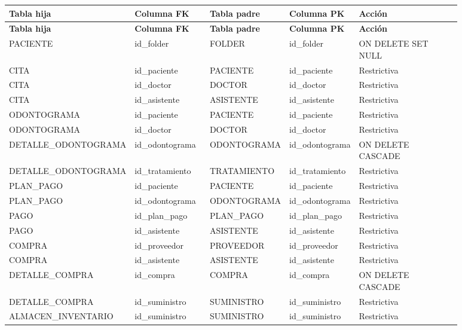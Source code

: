 \begin{longtable}{p{0.18\linewidth}p{0.18\linewidth}p{0.08\linewidth}p{0.08\linewidth}p{0.36\linewidth}}
\toprule
\textbf{Tabla hija} & \textbf{Columna FK} & \textbf{Tabla padre} & \textbf{Columna PK} & \textbf{Acción} \\
\midrule
\endfirsthead
\toprule
\textbf{Tabla hija} & \textbf{Columna FK} & \textbf{Tabla padre} & \textbf{Columna PK} & \textbf{Acción} \\
\midrule
\endhead
PACIENTE & id\_folder & FOLDER & id\_folder & ON DELETE SET NULL \\
CITA & id\_paciente & PACIENTE & id\_paciente & Restrictiva \\
CITA & id\_doctor & DOCTOR & id\_doctor & Restrictiva \\
CITA & id\_asistente & ASISTENTE & id\_asistente & Restrictiva \\
ODONTOGRAMA & id\_paciente & PACIENTE & id\_paciente & Restrictiva \\
ODONTOGRAMA & id\_doctor & DOCTOR & id\_doctor & Restrictiva \\
DETALLE\_ODONTOGRAMA & id\_odontograma & ODONTOGRAMA & id\_odontograma & ON DELETE CASCADE \\
DETALLE\_ODONTOGRAMA & id\_tratamiento & TRATAMIENTO & id\_tratamiento & Restrictiva \\
PLAN\_PAGO & id\_paciente & PACIENTE & id\_paciente & Restrictiva \\
PLAN\_PAGO & id\_odontograma & ODONTOGRAMA & id\_odontograma & Restrictiva \\
PAGO & id\_plan\_pago & PLAN\_PAGO & id\_plan\_pago & Restrictiva \\
PAGO & id\_asistente & ASISTENTE & id\_asistente & Restrictiva \\
COMPRA & id\_proveedor & PROVEEDOR & id\_proveedor & Restrictiva \\
COMPRA & id\_asistente & ASISTENTE & id\_asistente & Restrictiva \\
DETALLE\_COMPRA & id\_compra & COMPRA & id\_compra & ON DELETE CASCADE \\
DETALLE\_COMPRA & id\_suministro & SUMINISTRO & id\_suministro & Restrictiva \\
ALMACEN\_INVENTARIO & id\_suministro & SUMINISTRO & id\_suministro & Restrictiva \\
\bottomrule
\end{longtable}
\endgroup